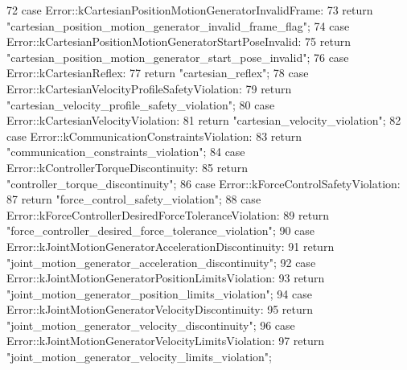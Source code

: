 \begin{DoxyCode}
72     \textcolor{keywordflow}{case} Error::kCartesianPositionMotionGeneratorInvalidFrame:
73       \textcolor{keywordflow}{return} \textcolor{stringliteral}{"cartesian\_position\_motion\_generator\_invalid\_frame\_flag"};
74     \textcolor{keywordflow}{case} Error::kCartesianPositionMotionGeneratorStartPoseInvalid:
75       \textcolor{keywordflow}{return} \textcolor{stringliteral}{"cartesian\_position\_motion\_generator\_start\_pose\_invalid"};
76     \textcolor{keywordflow}{case} Error::kCartesianReflex:
77       \textcolor{keywordflow}{return} \textcolor{stringliteral}{"cartesian\_reflex"};
78     \textcolor{keywordflow}{case} Error::kCartesianVelocityProfileSafetyViolation:
79       \textcolor{keywordflow}{return} \textcolor{stringliteral}{"cartesian\_velocity\_profile\_safety\_violation"};
80     \textcolor{keywordflow}{case} Error::kCartesianVelocityViolation:
81       \textcolor{keywordflow}{return} \textcolor{stringliteral}{"cartesian\_velocity\_violation"};
82     \textcolor{keywordflow}{case} Error::kCommunicationConstraintsViolation:
83       \textcolor{keywordflow}{return} \textcolor{stringliteral}{"communication\_constraints\_violation"};
84     \textcolor{keywordflow}{case} Error::kControllerTorqueDiscontinuity:
85       \textcolor{keywordflow}{return} \textcolor{stringliteral}{"controller\_torque\_discontinuity"};
86     \textcolor{keywordflow}{case} Error::kForceControlSafetyViolation:
87       \textcolor{keywordflow}{return} \textcolor{stringliteral}{"force\_control\_safety\_violation"};
88     \textcolor{keywordflow}{case} Error::kForceControllerDesiredForceToleranceViolation:
89       \textcolor{keywordflow}{return} \textcolor{stringliteral}{"force\_controller\_desired\_force\_tolerance\_violation"};
90     \textcolor{keywordflow}{case} Error::kJointMotionGeneratorAccelerationDiscontinuity:
91       \textcolor{keywordflow}{return} \textcolor{stringliteral}{"joint\_motion\_generator\_acceleration\_discontinuity"};
92     \textcolor{keywordflow}{case} Error::kJointMotionGeneratorPositionLimitsViolation:
93       \textcolor{keywordflow}{return} \textcolor{stringliteral}{"joint\_motion\_generator\_position\_limits\_violation"};
94     \textcolor{keywordflow}{case} Error::kJointMotionGeneratorVelocityDiscontinuity:
95       \textcolor{keywordflow}{return} \textcolor{stringliteral}{"joint\_motion\_generator\_velocity\_discontinuity"};
96     \textcolor{keywordflow}{case} Error::kJointMotionGeneratorVelocityLimitsViolation:
97       \textcolor{keywordflow}{return} \textcolor{stringliteral}{"joint\_motion\_generator\_velocity\_limits\_violation"};

\end{DoxyCode}
